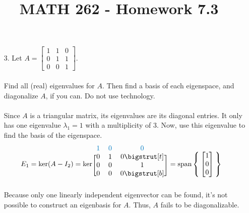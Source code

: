 \documentclass[letterpaper,12pt]{article}
\author{}
\title{MATH 262 - Homework 7.3}
\date{} %
\newcommand{\mat}[1]{
  \begin{bmatrix}
    #1
  \end{bmatrix}
}
\begin{document}
\maketitle

\begin{enumerate}
  \item[3.]
    Let $A = \mat{1 & 1 & 0 \\ 0 & 1 & 1 \\ 0 & 0 & 1}$. \\
    \\
    Find all (real) eigenvalues for $A$. Then find a basis of each eigenspace, and diagonalize $A$, if you can. Do not use technology. \\
    \\
    Since $A$ is a triangular matrix, its eigenvalues are its diagonal entries. It only has one eigenvalue $\lambda_1 = 1$ with a multiplicity of 3. Now, use this eigenvalue to find the basis of the eigenspace. \\
    \begin{align*}
      E_1 &= \text{ker}(A - I_2)
      = \text{ker} \begin{blockarray}{ccc}
        \color{bookblue}{1} & \color{bookblue}{0} & \color{bookblue}{0} \\
        \begin{block}{[ccc]}
          0 & 1 & 0 \bigstrut[t] \\
          0 & 0 & 1 \\
          0 & 0 & 0 \bigstrut[b] \\
        \end{block}
      \end{blockarray}
      = \text{span}\Set{\mat{1 \\ 0 \\ 0}}
    \end{align*}
    Because only one linearly independent eigenvector can be found, it's not possible to construct an eigenbasis for $A$. Thus, $A$ fails to be diagonalizable.

\end{enumerate}
\end{document}
